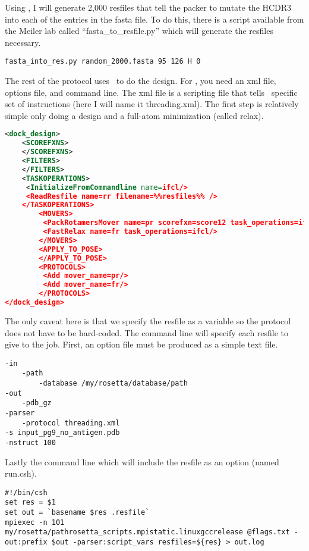 Using \rosettadesign, I will generate 2,000 resfiles that tell the packer to mutate the HCDR3 into each of the entries in the fasta file. To do this, there is a script available from the Meiler lab called ``fasta\_to\_resfile.py'' which will generate the resfiles necessary.

\begin{lstlisting}[breaklines=true]
fasta_into_res.py random_2000.fasta 95 126 H 0
\end{lstlisting}

The rest of the protocol uses \scripts~to do the design. For \scripts, you need an xml file, options file, and command line. The xml file is a scripting file that tells \rosetta~specific set of instructions (here I will name it threading.xml). The first step is relatively simple only doing a design and a full-atom minimization (called relax).

\begin{lstlisting}[breaklines=true, language=xml]
<dock_design>
    <SCOREFXNS>
    </SCOREFXNS>
    <FILTERS>
    </FILTERS>
    <TASKOPERATIONS>
     <InitializeFromCommandline name=ifcl/>
     <ReadResfile name=rr filename=%%resfiles%% />
    </TASKOPERATIONS>
        <MOVERS>
         <PackRotamersMover name=pr scorefxn=score12 task_operations=ifcl,rr/>
         <FastRelax name=fr task_operations=ifcl/>
        </MOVERS>
        <APPLY_TO_POSE>
        </APPLY_TO_POSE>
        <PROTOCOLS>
         <Add mover_name=pr/>
         <Add mover_name=fr/>
        </PROTOCOLS>
</dock_design>
\end{lstlisting}

The only caveat here is that we specify the resfile as a variable so the protocol does not have to be hard-coded. The command line will specify each resfile to give to the job. First, an option file must be produced as a simple text file.


\begin{lstlisting}[breaklines=true]
-in
    -path
        -database /my/rosetta/database/path
-out
    -pdb_gz
-parser
    -protocol threading.xml
-s input_pg9_no_antigen.pdb
-nstruct 100
\end{lstlisting}

Lastly the command line which will include the resfile as an option (named run.csh).

\begin{lstlisting}[breaklines=true]
#!/bin/csh
set res = $1
set out = `basename $res .resfile`
mpiexec -n 101 my/rosetta/pathrosetta_scripts.mpistatic.linuxgccrelease @flags.txt -out:prefix $out -parser:script_vars resfiles=${res} > out.log
\end{lstlisting}

